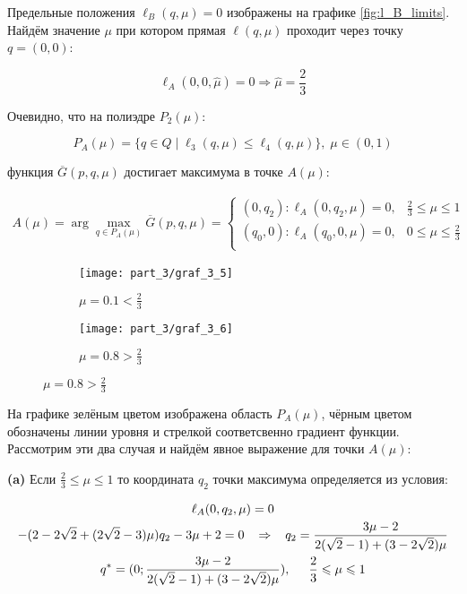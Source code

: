 	Предельные положения $\ell_B(q, \mu)=0$ изображены на графике \eqref{fig:l_B_limits}.
	Найдём значение $\mu$ при котором прямая 
	$\ell(q, \mu)$ проходит через точку
	$q=(0,0)$:
	
	$$\ell_A(0,0,\hat \mu) = 0 \Rightarrow \hat \mu = \frac{2}{3}$$
	
	Очевидно, что на полиэдре $P_2(\mu):$
	
	$$P_A(\mu)=\{q \in Q \; | 
	\;  \ell_3(q, \mu) \leqslant \ell_4(q, \mu) \}, \; \mu \in (0,1)$$
	
	функция $\overline{G}(p,q,\mu)$ достигает максимума в точке $A(\mu):$
	
	\begin{gather*}
		A(\mu)= \arg \max \limits_{q\in P_A(\mu)} \overline G(p,q,\mu) =
		\begin{cases}
			(0, q_2) : \ell_A(0,q_2,\mu)=0, & \frac{2}{3} \leqslant \mu \leqslant 1 \\
			(q_0, 0) : \ell_A(q_0,0,\mu)=0, & 0 \leqslant \mu \leqslant \frac{2}{3} \\
		\end{cases}		
	\end{gather*}
	
	\begin{figure}[H]
    	\centering
     	\begin{subfigure}[b]{0.45 \textwidth}
        	\centering
        	\texttt{[image: part\_3/graf\_3\_5]}
        	\caption{$\mu=0.1 < \frac{2}{3}$}
         	\label{fig:y equals x}
     	\end{subfigure}
     	\hspace{10mm}
     	\begin{subfigure}[b]{0.45 \textwidth}
        	\centering
        	\texttt{[image: part\_3/graf\_3\_6]}
        	\caption{$\mu=0.8 > \frac{2}{3}$}
        	\label{fig:three sin x}
     	\end{subfigure}
	\end{figure}	
	
	На графике зелёным цветом изображена область $P_A(\mu)$, чёрным цветом
	обозначены линии уровня и стрелкой соответсвенно градиент функции.
	Рассмотрим эти два случая и найдём явное выражение для точки $A(\mu)$:

	\textbf{(a)} Если $\frac{2}{3} \leqslant \mu \leqslant 1$ то координата $q_2$ точки 
	максимума определяется из условия: 	
	
	\begin{gather*}	
		\ell_A(0,q_2,\mu)=0 
		\\
		-(2-2\sqrt{2}+(2\sqrt{2}-3)\mu)q_2
		-3\mu+2=0
		\hspace{3mm} \Rightarrow \hspace{3mm}
		q_2=\frac{3\mu-2}{2(\sqrt{2}-1)+(3-2\sqrt{2})\mu}	
		\\
		q^*= (0;\dfrac{3\mu-2}{2(\sqrt{2}-1)+(3-2\sqrt{2})\mu}), 
		\hspace{5mm} \frac{2}{3} \leqslant \mu \leqslant 1
	\end{gather*}



